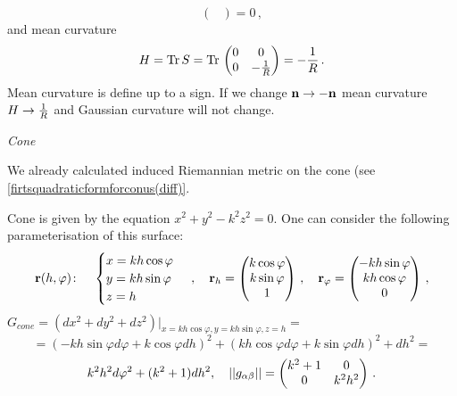 \documentclass[12pt]{article}
\theoremstyle{theorem}
\numberwithin{equation}{section}
\begin{document}
{\begin{equation}
\begin{pmatrix}
                                   \end{pmatrix}=0\,,
     \end{equation}
     and mean curvature
      \begin{equation}\label{meanianforcylinder}
        H={\rm Tr\,} S={\rm Tr\,}
                              \begin{pmatrix}0&0\cr
                                0&-{1\over R}\cr
                                   \end{pmatrix}=-{1\over R}\,.
     \end{equation}
Mean curvature is define up to a sign. If we change ${\bf n}\to-{\bf n}$ mean curvature $H\to {1\over R}$ and Gaussian curvature
will not change.


\bigskip

{\it Cone}

  We already calculated induced Riemannian metric on the cone (see \eqref{firtsquadraticformforconus(diff)}.

 Cone is given by the equation $x^2+y^2-k^2z^2=0$. One can consider the following
parameterisation
 of this surface:
\begin{equation}\label{surface111}
  {\bf r}(h,\varphi)\colon\quad
  \begin{cases}
  x=kh\cos\varphi\\
  y=kh\sin\varphi\\
  z=h\\
  \end{cases}\,,\quad   {\bf r}_h=
  \begin{pmatrix}
        k\cos\varphi\\
        k\sin\varphi\\
        1\\
   \end{pmatrix}\,,
\quad
  {\bf r}_\varphi=\begin{pmatrix}
        -kh\sin\varphi\\
        kh\cos\varphi\\
          0\\
   \end{pmatrix}\,,
\end{equation}
$G_{cone}=\left(dx^2+dy^2+dz^2\right)\big\vert_{x=kh\cos\varphi,y=kh\sin\varphi,z=h}=$
        \begin{equation*}\label{firtsquadraticformcylinder(diff)11}
               =(-kh\sin\varphi d\varphi+k\cos\varphi dh)^2+
               (kh\cos\varphi d\varphi+k\sin\varphi dh)^2+dh^2=
                      \end{equation*}
             $$
              k^2h^2d\varphi^2+(k^2+1)dh^2,\quad
               ||g_{\alpha\beta}||=
  \begin{pmatrix}
   k^2+1 & 0 \\
   0& k^2h^2 \\
   \end{pmatrix}\,.
          $$

}
\end{document}
